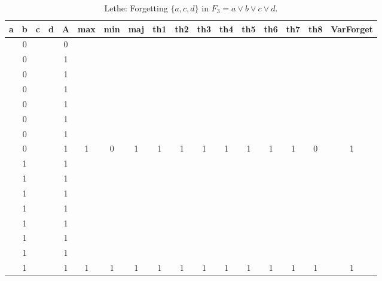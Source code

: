 \begin{table}[!tb]
    \centering
    \begin{tabular}{|c|c|c|c|c|c|c|c|c|c|c|c|c|c|c|c|c|}
        \hline
        \textbf{a} & \textbf{b} & \textbf{c} & \textbf{d} & \textbf{A} & \textbf{max} & \textbf{min} & \textbf{maj} & \textbf{th1} & \textbf{th2} & \textbf{th3} & \textbf{th4} & \textbf{th5} & \textbf{th6} & \textbf{th7} & \textbf{th8} & \textbf{VarForget} \\ \hline
        \rowcolor{gray!40}  & 0 &  &  & 0 &  &  &  &  &  &  &  &  &  &  &  &  \\ \hline
        \rowcolor{gray!40}  & 0 &  &  & 1 &  &  &  &  &  &  &  &  &  &  &  &  \\ \hline
        \rowcolor{gray!40}  & 0 &  &  & 1 &  &  &  &  &  &  &  &  &  &  &  &  \\ \hline
        \rowcolor{gray!40}  & 0 &  &  & 1 &  &  &  &  &  &  &  &  &  &  &  &  \\ \hline
        \rowcolor{gray!40}  & 0 &  &  & 1 &  &  &  &  &  &  &  &  &  &  &  &  \\ \hline
        \rowcolor{gray!40}  & 0 &  &  & 1 &  &  &  &  &  &  &  &  &  &  &  &  \\ \hline
        \rowcolor{gray!40}  & 0 &  &  & 1 &  &  &  &  &  &  &  &  &  &  &  &  \\ \hline
        \rowcolor{gray!40}  & 0 &  &  & 1 & 1 & 0 & 1 & 1 & 1 & 1 & 1 & 1 & 1 & 1 & 0 & 1 \\ \hline
        \rowcolor{blue!40}  & 1 &  &  & 1 &  &  &  &  &  &  &  &  &  &  &  &  \\ \hline
        \rowcolor{blue!40}  & 1 &  &  & 1 &  &  &  &  &  &  &  &  &  &  &  &  \\ \hline
        \rowcolor{blue!40}  & 1 &  &  & 1 &  &  &  &  &  &  &  &  &  &  &  &  \\ \hline
        \rowcolor{blue!40}  & 1 &  &  & 1 &  &  &  &  &  &  &  &  &  &  &  &  \\ \hline
        \rowcolor{blue!40}  & 1 &  &  & 1 &  &  &  &  &  &  &  &  &  &  &  &  \\ \hline
        \rowcolor{blue!40}  & 1 &  &  & 1 &  &  &  &  &  &  &  &  &  &  &  &  \\ \hline
        \rowcolor{blue!40}  & 1 &  &  & 1 &  &  &  &  &  &  &  &  &  &  &  &  \\ \hline
        \rowcolor{blue!40}  & 1 &  &  & 1 & 1 & 1 & 1 & 1 & 1 & 1 & 1 & 1 & 1 & 1 & 1 & 1 \\ \hline
    \end{tabular}
    \caption{Lethe: Forgetting $\{a, c, d\}$ in $F_{3} = a \lor b \lor c \lor d$.}
    \label{tab:lethe-F3-acd}
\end{table}
